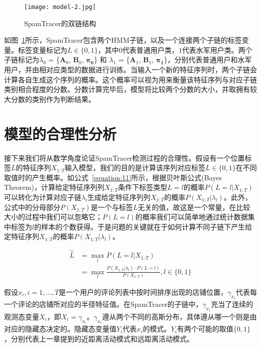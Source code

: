 \begin{figure}[htbp]
	\centering
	\begin{minipage}[htbp]{0.6\textwidth}
		\centering
		\texttt{[image: model-2.jpg]}
		\caption[SpamTracer的双链结构]
		{SpamTracer的双链结构\label{fig:lhmm}}		
	\end{minipage}     
\end{figure}


如图~\ref{fig:lhmm}所示，SpamTracer包含两个HMM子链，以及一个连接两个子链的标签变量。标签变量标记为$L\in\{0,1\}$，其中$0$代表普通用户类，$1$代表水军用户类。两个子链标记为$\lambda_{0}$ = \{$\mathbf{A}_0$, $\mathbf{B}_0$, $\mathbf{\pi_0}$\} 和 $\lambda_{1}$ = \{$\mathbf{A}_1$, $\mathbf{B}_1$, $\mathbf{\pi_1}$\}，分别代表普通用户和水军用户，并由相对应类型的数据进行训练。当输入一个新的特征序列时，两个子链会计算各自生成这个序列的概率。这个概率可以视为用来衡量该特征序列与对应子链类别相合程度的分数。分数计算完毕后，模型将比较两个分数的大小，并取拥有较大分数的类别作为判断结果。


\section{模型的合理性分析}


接下来我们将从数学角度论证SpamTracer检测过程的合理性。假设有一个位置标签$L$的特征序列$X_{1:T}$输入模型，我们的目的是计算该序列对应标签$L\in\{0,1\}$在不同取值时的产生概率。如公式~\eqref{equation:11}所示，根据贝叶斯公式(Bayes Theorem)，计算给定特征序列列$X_{1:T}$条件下标签类型$L = l$的概率$P(L=l|X_{1:T})$可以转化为计算对应子链$\lambda_l$生成给定特征序列列$X_{1:T}$的概率$P(X_{1:T} | \lambda_l)$。此外，公式中的分母部分$P(X_{1:T})$是一个与标签$L$无关的值，故这是一个常量，在比较大小的过程中我们可以忽略它；$P(L = l)$的概率我们可以简单地通过统计数据集中标签为$l$的样本的个数获得。于是问题的关键就在于如何计算不同子链下产生给定特征序列$X_{1:T}$的概率$P(X_{1:T} | \lambda_l)$。

\begin{equation}
\label{equation:11}
\begin{aligned}
\widehat{L} & = \max_{l}{P(L = l| X_{1:T})} \\
& = \max_{l}{\frac{P(X_{1:T} | \lambda_l) \cdot P(L = l)}{P(X_{1:T})}}, l\in \{0,1\}
\end{aligned}
\end{equation}

假设$x_i, i = 1,...,T$是一个用户的评论列表中按时间排序出现的店铺位置，$\gamma_{x_i}$代表每一个评论的店铺所对应的半径特征值。在SpamTracer的子链中，$\gamma_{x_i}$充当了连续的观测态变量$X_i$，即$X_i = \gamma_{x_i}$。$\gamma_{x_i}$遵从两个不同的高斯分布，具体遵从哪一个则是由对应的隐藏态决定的。隐藏态变量值$Y_i$代表$x_i$的模式。$Y_i$有两个可能的取值$\{0,1\}$，分别代表上一章提到的近距离活动模式和远距离活动模式。

